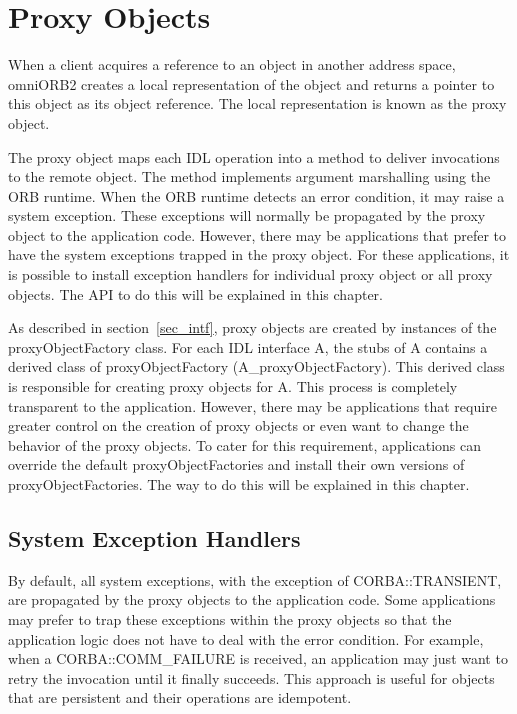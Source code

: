 \documentclass[11pt,twoside,onecolumn]{book}
\begin{document}
\chapter{Proxy Objects}

When a client acquires a reference to an object in another address space,
omniORB2 creates a local representation of the object and returns a pointer
to this object as its object reference. The local representation is known
as the proxy object. 

The proxy object maps each IDL operation into a method to deliver
invocations to the remote object. The method implements argument
marshalling using the ORB runtime. When the ORB runtime detects an error
condition, it may raise a system exception. These exceptions will normally be
propagated by the proxy object to the application code. However, there may
be applications that prefer to have the system exceptions trapped in the
proxy object. For these applications, it is possible to install exception
handlers for individual proxy object or all proxy objects. The API to do
this will be explained in this chapter.


As described in section~\ref{sec_intf}, proxy objects are created by
instances of the proxyObjectFactory class. For each IDL interface A, the
stubs of A contains a derived class of proxyObjectFactory
(A\_proxyObjectFactory). This derived class is responsible for creating
proxy objects for A. This process is completely transparent to the
application. However, there may be applications that require greater
control on the creation of proxy objects or even want to change the
behavior of the proxy objects. To cater for this requirement, applications
can override the default proxyObjectFactories and install their own
versions of proxyObjectFactories. The way to do this will be explained in
this chapter.


\section{System Exception Handlers}

By default, all system exceptions, with the exception of CORBA::TRANSIENT,
are propagated by the proxy objects to the application code. Some
applications may prefer to trap these exceptions within the proxy objects so
that the application logic does not have to deal with the error
condition. For example, when a CORBA::COMM\_FAILURE is received, an
application may just want to retry the invocation until it finally
succeeds. This approach is useful for objects that are persistent and their
operations are idempotent.
\end{document}

